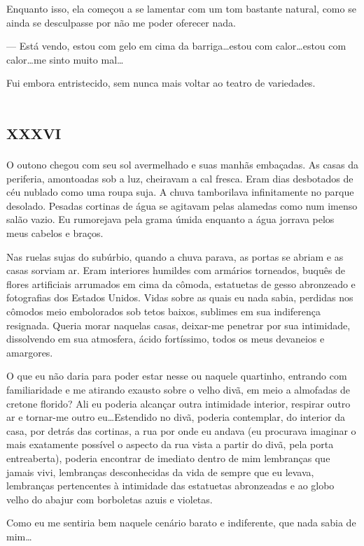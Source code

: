 Enquanto isso, ela começou a se lamentar com um tom bastante natural, como se ainda se desculpasse por não me poder oferecer nada.

--- Está vendo, estou com gelo em cima da barriga\dots estou com calor\dots estou com calor\dots me sinto muito mal\dots

Fui embora entristecido, sem nunca mais voltar ao teatro de variedades.


\chapter*{\huge\centering\textsc{xxxvi}}

O outono chegou com seu sol avermelhado e suas manhãs embaçadas. As casas da periferia, amontoadas sob a luz, cheiravam a cal fresca. Eram dias desbotados de céu nublado como uma roupa suja. A chuva tamborilava infinitamente no parque desolado. Pesadas cortinas de água se agitavam pelas alamedas como num imenso salão vazio. Eu rumorejava pela grama úmida enquanto a água jorrava pelos meus cabelos e braços.

Nas ruelas sujas do subúrbio, quando a chuva parava, as portas se abriam e as casas sorviam ar. Eram interiores humildes com armários torneados, buquês de flores artificiais arrumados em cima da cômoda, estatuetas de gesso abronzeado e fotografias dos Estados Unidos. Vidas sobre as quais eu nada sabia, perdidas nos cômodos meio embolorados sob tetos baixos, sublimes em sua indiferença resignada.
Queria morar naquelas casas, deixar-me penetrar por sua intimidade, dissolvendo em sua atmosfera, ácido fortíssimo, todos os meus devaneios e amargores.

O que eu não daria para poder estar nesse ou naquele quartinho, entrando com familiaridade e me atirando exausto sobre o velho divã, em meio a almofadas de cretone florido? Ali eu poderia alcançar outra intimidade interior, respirar outro ar e tornar-me outro eu\dots Estendido no divã, poderia contemplar, do interior da casa, por detrás das cortinas, a rua por onde eu andava (eu procurava imaginar o mais exatamente possível o aspecto da rua vista a partir do divã, pela porta entreaberta), poderia encontrar de imediato dentro de mim lembranças que jamais vivi, lembranças desconhecidas da vida de sempre que eu levava, lembranças pertencentes à intimidade das estatuetas abronzeadas e ao globo velho do abajur com borboletas azuis e violetas.

Como eu me sentiria bem naquele cenário barato e indiferente, que nada sabia de mim\dots

